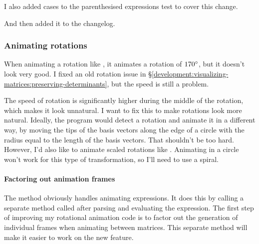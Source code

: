 \documentclass[../development.tex]{subfiles}
\begin{document}

I also added cases to the parenthesised expressions test to cover this change.


And then added it to the changelog.


\subsubsection{Animating rotations\label{development:making-v0.2.2:animating-rotations}}

When animating a rotation like , it animates a rotation of $170\degree$, but it doesn't look very good. I fixed an old rotation issue in \S\ref{development:visualizing-matrices:preserving-determinants}, but the speed is still a problem.

The speed of rotation is significantly higher during the middle of the rotation, which makes it look unnatural. I want to fix this to make rotations look more natural. Ideally, the program would detect a rotation and animate it in a different way, by moving the tips of the basis vectors along the edge of a circle with the radius equal to the length of the basis vectors. That shouldn't be too hard. However, I'd also like to animate scaled rotations like . Animating in a circle won't work for this type of transformation, so I'll need to use a spiral.

\paragraph{Factoring out animation frames\label{development:making-v0.2.2:animating-rotations:factoring-out-animation-frames}}

The  method obviously handles animating expressions. It does this by calling a separate method called  after parsing and evaluating the expression. The first step of improving my rotational animation code is to factor out the generation of individual frames when animating between matrices. This separate method will make it easier to work on the new feature.
\end{document}
